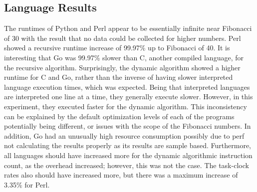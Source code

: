 \documentclass{sig-alternate}
\begin{document}
\subsection{Language Results}
The runtimes of Python and Perl appear to be essentially infinite near Fibonacci of 30 with the result that no data could be collected for higher numbers. Perl showed a recursive runtime increase of 99.97\% up to Fibonacci of 40. It is interesting that Go was 99.97\% slower than C, another compiled language, for the recursive algorithm. Surprisingly, the dynamic algorithm showed a higher runtime for C and Go, rather than the inverse of having slower interpreted language execution times, which was expected. Being that interpreted languages are interpreted one line at a time, they generally execute slower. However, in this experiment, they executed faster for the dynamic algorithm. This inconsistency can be explained by the default optimization levels of each of the programs potentially being different, or issues with the scope of the Fibonacci numbers. In addition, Go had an unusually high resource consumption possibly due to perf not calculating the results properly as its results are sample based. Furthermore, all languages should have increased more for the dynamic algorithmic instruction count, as the overhead increased; however, this was not the case. The task-clock rates also should have increased more, but there was a maximum increase of 3.35\% for Perl.
\end{document}
